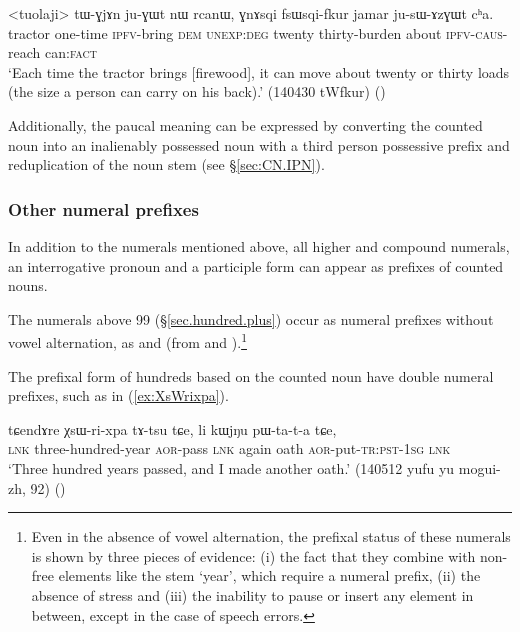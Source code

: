 \begin{exe}
\ex \label{ex:GnAsqi.fsWqifkur}
\gll <tuolaji> tɯ-ɣjɤn ju-ɣɯt nɯ rcanɯ, ɣnɤsqi fsɯsqi-fkur jamar ju-sɯ-ɤzɣɯt cʰa.  \\
 tractor one-time \textsc{ipfv}-bring \textsc{dem} \textsc{unexp}:\textsc{deg} twenty thirty-burden about \textsc{ipfv}-\textsc{caus}-reach can:\textsc{fact} \\
\glt `Each time the tractor brings [firewood], it can move about twenty or thirty loads (the size a person can carry on his back).' (140430 tWfkur)
()
\end{exe}

Additionally, the paucal meaning can be expressed by converting the counted noun into an inalienably possessed noun with a third person possessive prefix and reduplication of the noun stem (see §\ref{sec:CN.IPN}).

\subsubsection{Other numeral prefixes} \label{sec:other.numeral.prefixes}
In addition to the numerals mentioned above, all higher and compound numerals, an interrogative pronoun and a participle form can appear as prefixes of counted nouns.

The numerals above 99 (§\ref{sec.hundred.plus}) occur as numeral prefixes without vowel alternation, as  and  (from  and ).\footnote{Even in the absence of vowel alternation, the prefixal status of these numerals is shown by three pieces of evidence: (i) the fact that they combine with non-free elements like the stem  `year', which require a numeral prefix, (ii) the absence of stress and (iii) the inability to pause or insert any element in between, except in the case of speech errors. } 

The prefixal form of hundreds based on the counted noun  have double numeral prefixes, such as  in (\ref{ex:XsWrixpa}).

\begin{exe}
\ex \label{ex:XsWrixpa}
\gll tɕendɤre χsɯ-ri-xpa tɤ-tsu tɕe, li kɯjŋu pɯ-ta-t-a tɕe, \\
 \textsc{lnk} three-hundred-year \textsc{aor}-pass \textsc{lnk} again oath \textsc{aor}-put-\textsc{tr}:\textsc{pst}-\textsc{1sg} \textsc{lnk} \\
\glt `Three hundred years passed, and I made another oath.' (140512 yufu yu mogui-zh, 92)
()
\end{exe}

